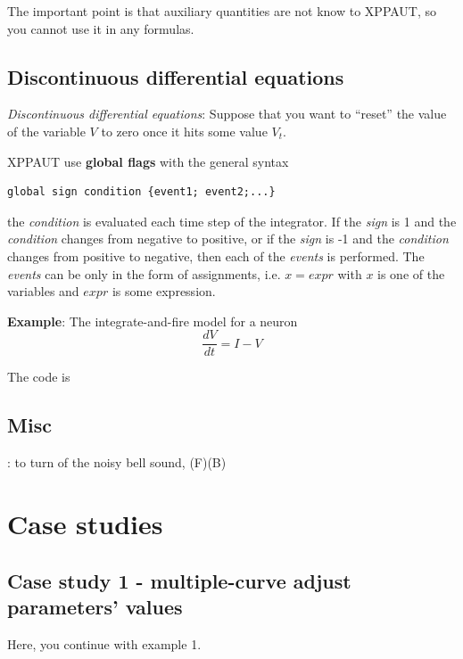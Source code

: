 The important point is that auxiliary quantities are not know to
XPPAUT, so you cannot use it in any formulas.


\subsection{Discontinuous differential equations}
\label{sec:disc-diff-equat}

{\it Discontinuous differential equations}: Suppose that you want to
``reset'' the value of the variable $V$ to zero once it hits some
value $V_t$.

XPPAUT use {\bf global flags} with the general syntax
\begin{lstlisting}
global sign condition {event1; event2;...}
\end{lstlisting}
the {\it condition} is evaluated each time step of the integrator. If
the {\it sign} is 1 and the {\it condition} changes from negative to
positive, or if the {\it sign} is -1 and the {\it condition} changes
from positive to negative, then each of the {\it events} is
performed. The {\it events} can be only in the form of assignments,
i.e. $x=expr$ with $x$ is one of the variables and $expr$ is some
expression.

{\bf Example}: The integrate-and-fire model for a neuron
\begin{equation}
  \label{eq:284}
  \frac{dV}{dt}=I-V
\end{equation}

The code is


\subsection{Misc}
\label{sec:misc}


: to turn of the noisy bell sound, (F)(B)

\section{Case studies}
\label{sec:case-studies}

\subsection{Case study 1 - multiple-curve adjust parameters' values}
\label{sec:case-study-1}

Here, you continue with example 1.

